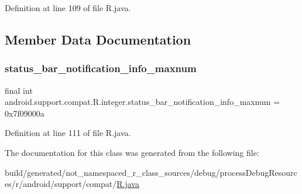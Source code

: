 Definition at line 109 of file R.\+java.


\begin{DoxyCode}{0}

\end{DoxyCode}


\subsection{Member Data Documentation}
\mbox{\label{classandroid_1_1support_1_1compat_1_1_r_1_1integer_a5d0dcdb625a5957f6a037d53cde095c6}} 
\subsubsection{\texorpdfstring{status\_bar\_notification\_info\_maxnum}{status\_bar\_notification\_info\_maxnum}}
{\footnotesize\ttfamily final int android.\+support.\+compat.\+R.\+integer.\+status\+\_\+bar\+\_\+notification\+\_\+info\+\_\+maxnum = 0x7f09000a\hspace{0.3cm}{\ttfamily [static]}}



Definition at line 111 of file R.\+java.



The documentation for this class was generated from the following file\+:\begin{DoxyCompactItemize}
\item 
build/generated/not\+\_\+namespaced\+\_\+r\+\_\+class\+\_\+sources/debug/process\+Debug\+Resources/r/android/support/compat/\mbox{\hyperlink{android_2support_2compat_2_r_8java}{R.\+java}}\end{DoxyCompactItemize}
